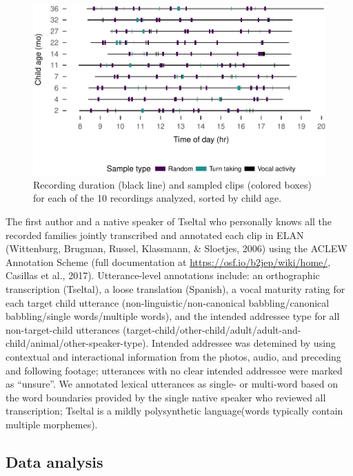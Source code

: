 \documentclass[floatsintext,man]{apa6}
\theoremstyle{definition}
\theoremstyle{definition}
\theoremstyle{definition}
\theoremstyle{remark}
\begin{document}
\begin{figure}
\centering
\includegraphics{Tseltal-CLE_files/figure-latex/fig2-1.pdf}
\caption{\label{fig:fig2}Recording duration (black line) and sampled clips
(colored boxes) for each of the 10 recordings analyzed, sorted by child
age.}
\end{figure}

The first author and a native speaker of Tseltal who personally knows
all the recorded families jointly transcribed and annotated each clip in
ELAN (Wittenburg, Brugman, Russel, Klassmann, \& Sloetjes, 2006) using
the ACLEW Annotation Scheme (full documentation at
\url{https://osf.io/b2jep/wiki/home/}, Casillas et al., 2017).
Utterance-level annotations include: an orthographic transcription
(Tseltal), a loose translation (Spanish), a vocal maturity rating for
each target child utterance (non-linguistic/non-canonical
babbling/canonical babbling/single words/multiple words), and the
intended addressee type for all non-target-child utterances
(target-child/other-child/adult/adult-and-child/animal/other-speaker-type).
Intended addressee was detemined by using contextual and interactional
information from the photos, audio, and preceding and following footage;
utterances with no clear intended addressee were marked as
\enquote{unsure}. We annotated lexical utterances as single- or
multi-word based on the word boundaries provided by the single native
speaker who reviewed all transcription; Tseltal is a mildly
polysynthetic language(words typically contain multiple morphemes).

\subsection{Data analysis}\label{methods-analysisinfo}
\end{document}
